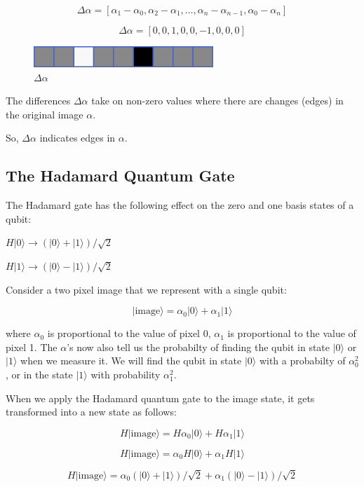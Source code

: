 \documentclass[11pt]{article}
\makeatletter
\def\maxwidth{\ifdim\Gin@nat@width>\linewidth\linewidth
    \else\Gin@nat@width\fi}
\let\Oldincludegraphics\includegraphics
\renewcommand{\includegraphics}[1]{\Oldincludegraphics[width=.8\maxwidth]{#1}}
\makeatother
\begin{document}
\[\Delta \alpha = [\alpha_1-\alpha_0, \alpha_2-\alpha_1, \ldots, \alpha_n-\alpha_{n-1},\alpha_0-\alpha_n]\]

\[\Delta \alpha = [0,0,1,0,0,-1,0,0,0]\]

\begin{figure}[h]
\centering
\includegraphics{../img/dp.png}
\caption{$\Delta\alpha$}
\end{figure}

The differences \(\Delta \alpha\) take on non-zero values where there
are changes (edges) in the original image \(\alpha\).

So, \(\Delta \alpha\) indicates edges in \(\alpha\).

    \hypertarget{the-hadamard-quantum-gate}{%
\subsection{The Hadamard Quantum Gate}\label{the-hadamard-quantum-gate}}

    The Hadamard gate has the following effect on the zero and one basis
states of a qubit:

\(H|0\rangle \rightarrow (|0\rangle + |1\rangle)/\sqrt{2}\)

\(H|1\rangle \rightarrow (|0\rangle - |1\rangle)/\sqrt{2}\)

Consider a two pixel image that we represent with a single qubit:

\[|\textrm{image}\rangle = \alpha_0 |0\rangle + \alpha_1 |1\rangle\]

where \(\alpha_0\) is proportional to the value of pixel 0, \(\alpha_1\)
is proportional to the value of pixel 1. The \(\alpha\)'s now also tell
us the probabilty of finding the qubit in state \(|0\rangle\) or
\(|1\rangle\) when we measure it. We will find the qubit in state
\(|0\rangle\) with a probabilty of \(\alpha_0^2\), or in the state
\(|1\rangle\) with probability \(\alpha_1^2\).

    When we apply the Hadamard quantum gate to the image state, it gets
transformed into a new state as follows:

\[H|\textrm{image}\rangle = H \alpha_0 |0\rangle + H \alpha_1 |1\rangle\]

\[H|\textrm{image}\rangle = \alpha_0 H |0\rangle + \alpha_1 H |1\rangle\]

\[H|\textrm{image}\rangle = \alpha_0 (|0\rangle + |1\rangle)/\sqrt{2} + \alpha_1 (|0\rangle - |1\rangle)/\sqrt{2}\]
\end{document}
